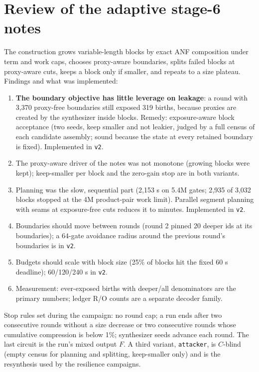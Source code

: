 \documentclass[11pt,a4paper]{article}
\newcommand{\code}[1]{\texttt{#1}}
\begin{document}
\section{Review of the adaptive stage-6 notes}
The construction grows variable-length blocks by exact ANF composition under term and work caps, chooses proxy-aware boundaries, splits failed blocks at proxy-aware cuts, keeps a block only if smaller, and repeats to a size plateau. Findings and what was implemented:
\begin{enumerate}
\item \textbf{The boundary objective has little leverage on leakage}: a round with 3{,}370 proxy-free boundaries still exposed 319 births, because proxies are created by the synthesizer inside blocks. Remedy: exposure-aware block acceptance (two seeds, keep smaller and not leakier, judged by a full census of each candidate assembly; sound because the state at every retained boundary is fixed). Implemented in \code{v2}.
\item The proxy-aware driver of the notes was not monotone (growing blocks were kept); keep-smaller per block and the zero-gain stop are in both variants.
\item Planning was the slow, sequential part (2{,}153 s on 5.4M gates; 2{,}935 of 3{,}032 blocks stopped at the 4M product-pair work limit). Parallel segment planning with seams at exposure-free cuts reduces it to minutes. Implemented in \code{v2}.
\item Boundaries should move between rounds (round 2 pinned 20 deeper ids at its boundaries); a 64-gate avoidance radius around the previous round's boundaries is in \code{v2}.
\item Budgets should scale with block size (25\% of blocks hit the fixed 60 s deadline); 60/120/240 s in \code{v2}.
\item Measurement: ever-exposed births with deeper/all denominators are the primary numbers; ledger R/O counts are a separate decoder family.
\end{enumerate}
Stop rules set during the campaign: no round cap; a run ends after two consecutive rounds without a size decrease or two consecutive rounds whose cumulative compression is below 1\%; synthesizer seeds advance each round. The last circuit is the run's mixed output $F$. A third variant, \code{attacker}, is $C$-blind (empty census for planning and splitting, keep-smaller only) and is the resynthesis used by the resilience campaigns.
\end{document}
